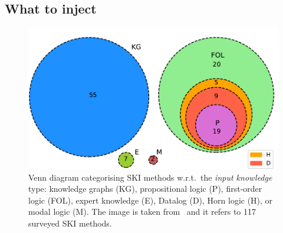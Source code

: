 \subsection{What to inject}\label{subsec:what-to-inject}
%
\begin{figure}
    \centering
    \includegraphics[width=.4\linewidth]{figures/ski-logic}
    \caption[Venn diagram categorising SKI methods]{
        Venn diagram categorising SKI methods w.r.t.\ the \emph{input knowledge} type: knowledge graphs (KG), propositional logic (P), first-order logic (FOL), expert knowledge (E), Datalog (D), Horn logic (H), or modal logic (M).
        The image is taken from~\cite{DBLP:journals/csur/CiattoSAMO24} and it refers to 117 surveyed \gls{SKI} methods.
    }
    \label{fig:pie-ski-logic}
\end{figure}

